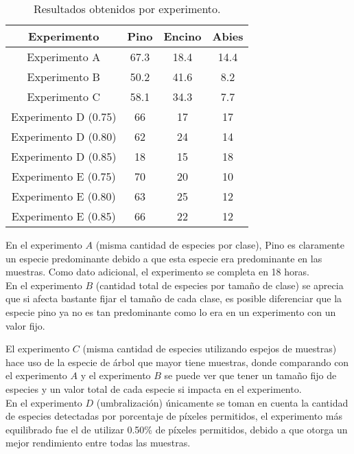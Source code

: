 \documentclass[review]{elsarticle}
\begin{document}
\begin{table}[h!]
\caption{Resultados obtenidos por experimento.}
\centering
\begin{tabular}{|c|c|c|c|}
			\hline
			 \textbf{Experimento} & \textbf{Pino} & \textbf{Encino} & \textbf{Abies}\\
			\hline
			Experimento A & 67.3 & 18.4 & 14.4\\
			\hline
			Experimento B & 50.2 & 41.6 & 8.2\\
			\hline
			Experimento C & 58.1 & 34.3 & 7.7\\
			\hline
			Experimento D (0.75) & 66 & 17 & 17\\
			\hline
			Experimento D (0.80) & 62 & 24 & 14\\
			\hline
			Experimento D (0.85) & 18 & 15 & 18\\
			\hline
			Experimento E (0.75) & 70 & 20 & 10\\
			\hline
			Experimento E (0.80) & 63 & 25 & 12\\
			\hline
			Experimento E (0.85) & 66 & 22 & 12\\
			\hline
		\end{tabular}
		\label{Resultados-obtenidos}
\end{table}

En el experimento $A$ (misma cantidad de especies por clase), Pino es claramente un especie predominante debido a que esta especie era predominante en las muestras. Como dato adicional, el experimento se completa en 18 horas.\\

En el experimento $B$ (cantidad total de especies por tamaño de clase) se aprecia que si afecta bastante fijar el tamaño de cada clase, es posible diferenciar que la especie pino ya no es tan predominante como lo era en un experimento con un valor fijo.

El experimento $C$ (misma cantidad de especies utilizando espejos de muestras) hace uso de la especie de árbol que mayor tiene muestras, donde comparando con el experimento $A$ y el experimento $B$ se puede ver  que tener un tamaño fijo de especies y un valor total de cada especie si impacta en el experimento.\\

En el experimento $D$ (umbralización) únicamente se toman en cuenta la cantidad de especies detectadas por porcentaje de píxeles permitidos, el experimento más equilibrado fue el de utilizar 0.50\% de píxeles permitidos, debido a que otorga un mejor rendimiento entre todas las muestras.\\
\end{document}
